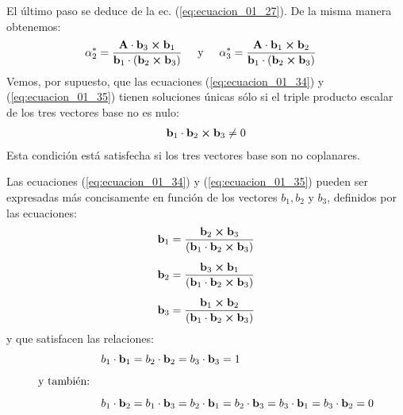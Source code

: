 El último paso se deduce de la ec. (\ref{eq:ecuacion_01_27}). De la misma manera obtenemos:
\begin{align}
\alpha_{2}^{*} &= \dfrac{\vb{A} \cdot \vb{b}_{3} \cp \vb{b}_{1}}{\vb{b}_{1} \cdot \left( \vb{b}_{2} \cp \vb{b}_{3} \right)} \hspace{0.5cm} \text{y} \hspace{0.5cm}
\alpha_{3}^{*} = \dfrac{\vb{A} \cdot \vb{b}_{1} \cp \vb{b}_{2}}{\vb{b}_{1} \cdot \left( \vb{b}_{2} \cp \vb{b}_{3} \right)}
\label{eq:ecuacion_01_35}
\end{align}
Vemos, por supuesto, que las ecuaciones (\ref{eq:ecuacion_01_34}) y (\ref{eq:ecuacion_01_35}) tienen soluciones únicas sólo si el triple producto escalar de los tres vectores base no es nulo:
\begin{align*}
    \vb{b}_{1} \cdot \vb{b}_{2} \cp \vb{b}_{3} \neq 0
\end{align*}
Esta condición está satisfecha si los tres vectores base son no coplanares.
\par
Las ecuaciones (\ref{eq:ecuacion_01_34}) y (\ref{eq:ecuacion_01_35}) pueden ser expresadas más concisamente en función de los vectores $b_{1}, b_{2}$ y $b_{3}$, definidos por las ecuaciones:
\begin{align}
\begin{aligned}
\vb{b}_{1} &= \dfrac{\vb{b}_{2} \cp \vb{b}_{3}}{\left( \vb{b}_{1} \cdot \vb{b}_{2} \cp \vb{b}_{3} \right)} \\[0.5em]
\vb{b}_{2} &= \dfrac{\vb{b}_{3} \cp \vb{b}_{1}}{\left( \vb{b}_{1} \cdot \vb{b}_{2} \cp \vb{b}_{3} \right)} \\[0.5em]
\vb{b}_{3} &= \dfrac{\vb{b}_{1} \cp \vb{b}_{2}}{\left( \vb{b}_{1} \cdot \vb{b}_{2} \cp \vb{b}_{3} \right)}
\end{aligned}
\label{eq:ecuacion_01_36}
\end{align}
y que satisfacen las relaciones:
\begin{align}
\begin{aligned}
&{} \hspace{2cm} b_{1} \cdot \vb{b}_{1} = b_{2} \cdot \vb{b}_{2} = b_{3} \cdot \vb{b}_{3} = 1 \\[0.5em]
&\text{y también:} \\[0.5em]
&{} \hspace{2cm} b_{1} \cdot \vb{b}_{2} = b_{1} \cdot \vb{b}_{3} = b_{2} \cdot \vb{b}_{1} = b_{2} \cdot \vb{b}_{3} = b_{3} \cdot \vb{b}_{1} = b_{3} \cdot \vb{b}_{2} = 0
\end{aligned}
\label{eq:ecuacion_01_37}
\end{align}
